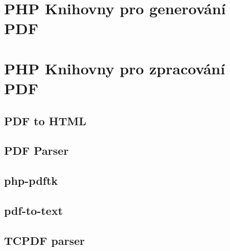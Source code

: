 \section{PHP Knihovny pro generování PDF}
\section{PHP Knihovny pro zpracování PDF}
\subsection{PDF to HTML}
\subsection{PDF Parser}
\subsection{php-pdftk}
\subsection{pdf-to-text}
\subsection{TCPDF parser}
